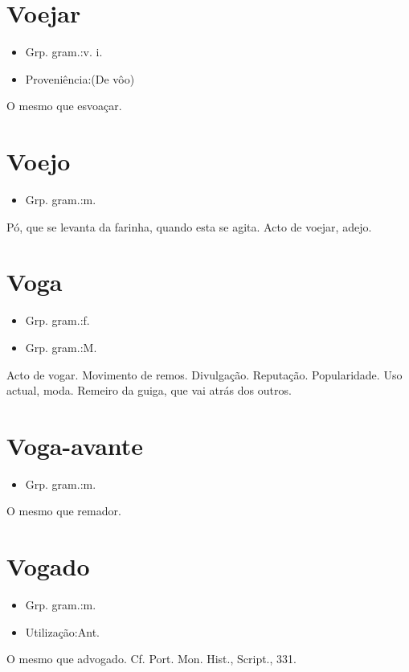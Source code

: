 \documentclass{article}
\begin{document}
\section{Voejar}
\begin{itemize}
\item {Grp. gram.:v. i.}
\end{itemize}
\begin{itemize}
\item {Proveniência:(De \textunderscore vôo\textunderscore )}
\end{itemize}
O mesmo que \textunderscore esvoaçar\textunderscore .
\section{Voejo}
\begin{itemize}
\item {Grp. gram.:m.}
\end{itemize}
Pó, que se levanta da farinha, quando esta se agita.
Acto de voejar, adejo.
\section{Voga}
\begin{itemize}
\item {Grp. gram.:f.}
\end{itemize}
\begin{itemize}
\item {Grp. gram.:M.}
\end{itemize}
Acto de vogar.
Movimento de remos.
Divulgação.
Reputação.
Popularidade.
Uso actual, moda.
Remeiro da guiga, que vai atrás dos outros.
\section{Voga-avante}
\begin{itemize}
\item {Grp. gram.:m.}
\end{itemize}
O mesmo que \textunderscore remador\textunderscore .
\section{Vogado}
\begin{itemize}
\item {Grp. gram.:m.}
\end{itemize}
\begin{itemize}
\item {Utilização:Ant.}
\end{itemize}
O mesmo que \textunderscore advogado\textunderscore . Cf. \textunderscore Port. Mon. Hist.\textunderscore , \textunderscore Script.\textunderscore , 331.
\end{document}
